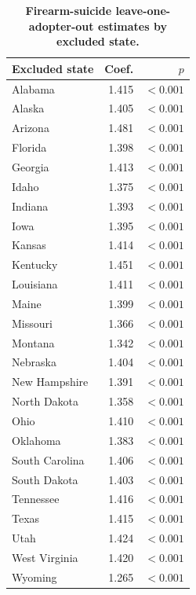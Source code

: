 \documentclass[10pt]{article}
\begin{document}
\begin{table}[H]
\centering
\caption{\textbf{Firearm-suicide leave-one-adopter-out estimates by excluded state.}}
\small
\begin{tabular}{lrr}
\toprule
Excluded state & Coef. & $p$ \\
\midrule
Alabama & 1.415 & $<0.001$ \\
Alaska & 1.405 & $<0.001$ \\
Arizona & 1.481 & $<0.001$ \\
Florida & 1.398 & $<0.001$ \\
Georgia & 1.413 & $<0.001$ \\
Idaho & 1.375 & $<0.001$ \\
Indiana & 1.393 & $<0.001$ \\
Iowa & 1.395 & $<0.001$ \\
Kansas & 1.414 & $<0.001$ \\
Kentucky & 1.451 & $<0.001$ \\
Louisiana & 1.411 & $<0.001$ \\
Maine & 1.399 & $<0.001$ \\
Missouri & 1.366 & $<0.001$ \\
Montana & 1.342 & $<0.001$ \\
Nebraska & 1.404 & $<0.001$ \\
New Hampshire & 1.391 & $<0.001$ \\
North Dakota & 1.358 & $<0.001$ \\
Ohio & 1.410 & $<0.001$ \\
Oklahoma & 1.383 & $<0.001$ \\
South Carolina & 1.406 & $<0.001$ \\
South Dakota & 1.403 & $<0.001$ \\
Tennessee & 1.416 & $<0.001$ \\
Texas & 1.415 & $<0.001$ \\
Utah & 1.424 & $<0.001$ \\
West Virginia & 1.420 & $<0.001$ \\
Wyoming & 1.265 & $<0.001$ \\
\bottomrule
\end{tabular}
\end{table}
\end{document}
